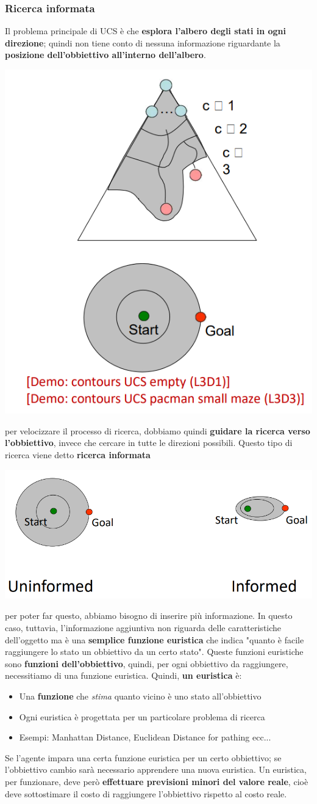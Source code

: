 \documentclass[12pt]{article}
\begin{document}
\subsubsection{Ricerca informata}
Il problema principale di UCS è che \textbf{esplora l'albero degli stati in ogni direzione}; quindi non tiene conto di nessuna informazione
riguardante la \textbf{posizione dell'obbiettivo all'interno dell'albero}.
\begin{center}
    \includegraphics[width = 0.40\linewidth]{Images/42.PNG}
\end{center}
per velocizzare il processo di ricerca, dobbiamo quindi \textbf{guidare la ricerca verso l'obbiettivo}, invece che cercare in tutte le direzioni possibili.
Questo tipo di ricerca viene detto \textbf{ricerca informata}
\begin{center}
    \includegraphics[width = 0.45\linewidth]{Images/43.PNG}
\end{center}
per poter far questo, abbiamo bisogno di inserire più informazione.
In questo caso, tuttavia, l'informazione aggiuntiva non riguarda delle caratteristiche dell'oggetto ma è una \textbf{semplice funzione euristica} che
indica "quanto è facile raggiungere lo stato un obbiettivo da un certo stato".
Queste funzioni euristiche sono \textbf{funzioni dell'obbiettivo}, quindi, per ogni obbiettivo da raggiungere, necessitiamo di una funzione euristica.
Quindi, \textbf{un euristica} è:
\begin{itemize}
    \item Una \textbf{funzione} che \textit{stima} quanto vicino è uno stato all'obbiettivo
    \item Ogni euristica è progettata per un particolare problema di ricerca
    \item Esempi: Manhattan Distance, Euclidean Distance for pathing ecc...
\end{itemize}
Se l'agente impara una certa funzione euristica per un certo obbiettivo; se l'obbiettivo cambio sarà necessario apprendere
una nuova euristica. Un euristica, per funzionare, deve però \textbf{effettuare previsioni minori del valore reale}, cioè deve sottostimare
il costo di raggiungere l'obbiettivo rispetto al costo reale.
\end{document}
